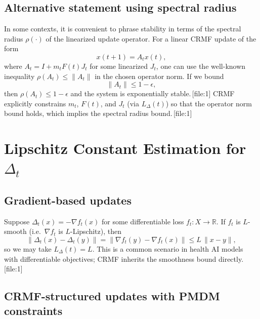 \documentclass[11pt]{article}
\begin{document}
\subsection{Alternative statement using spectral radius}

In some contexts, it is convenient to phrase stability in terms of the spectral radius $\rho(\cdot)$ of the linearized update operator.
For a linear CRMF update of the form
\[
  x(t+1) = A_t x(t),
\]
where $A_t = I + m_t F(t)J_t$ for some linearized $J_t$, one can use the well-known inequality $\rho(A_t)\le \|A_t\|$ in the chosen operator norm.
If we bound
\[
  \|A_t\| \le 1 - \epsilon,
\]
then $\rho(A_t)\le 1-\epsilon$ and the system is exponentially stable.\,[file:1]
CRMF explicitly constrains $m_t$, $F(t)$, and $J_t$ (via $L_\Delta(t)$) so that the operator norm bound holds, which implies the spectral radius bound.\,[file:1]

\section{Lipschitz Constant Estimation for $\Delta_t$}\label{sec:lipschitz_estimation}

\subsection{Gradient-based updates}

Suppose $\Delta_t(x) = -\nabla f_t(x)$ for some differentiable loss $f_t : X\to\mathbb{R}$.
If $f_t$ is $L$-smooth (i.e.\ $\nabla f_t$ is $L$-Lipschitz), then
\[
  \|\Delta_t(x) - \Delta_t(y)\|
  = \|\nabla f_t(y) - \nabla f_t(x)\|
  \le L\,\|x-y\|,
\]
so we may take $L_\Delta(t) = L$.
This is a common scenario in health AI models with differentiable objectives; CRMF inherits the smoothness bound directly.\,[file:1]

\subsection{CRMF-structured updates with PMDM constraints}
\end{document}
